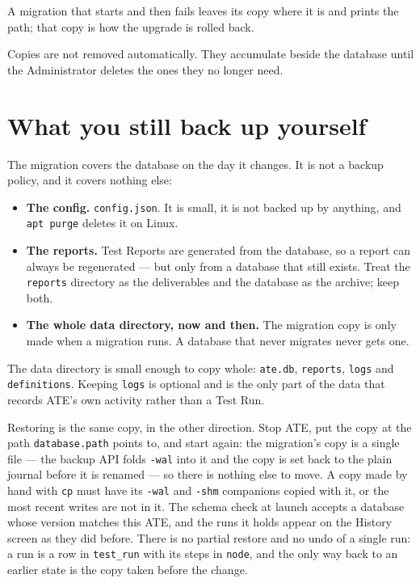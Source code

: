 A migration that starts and then fails leaves its copy where it is and prints the path; that copy is
how the upgrade is rolled back.

Copies are not removed automatically. They accumulate beside the database until the Administrator
deletes the ones they no longer need.

\section{What you still back up yourself}

The migration covers the database on the day it changes. It is not a backup policy, and it covers
nothing else:

\begin{itemize}
  \item \textbf{The config.} \texttt{config.json}. It is small, it is not backed up by anything, and
    \texttt{apt purge} deletes it on Linux.
  \item \textbf{The reports.} Test Reports are generated from the database, so a report can always be
    regenerated --- but only from a database that still exists. Treat the \texttt{reports} directory
    as the deliverables and the database as the archive; keep both.
  \item \textbf{The whole data directory, now and then.} The migration copy is only made when a
    migration runs. A database that never migrates never gets one.
\end{itemize}

The data directory is small enough to copy whole: \texttt{ate.db}, \texttt{reports}, \texttt{logs}
and \texttt{definitions}. Keeping \texttt{logs} is optional and is the only part of the data that
records ATE's own activity rather than a Test Run.

Restoring is the same copy, in the other direction. Stop ATE, put the copy at the path
\texttt{database.path} points to, and start again: the migration's copy is a single file --- the
backup API folds \texttt{-wal} into it and the copy is set back to the plain journal before it is
renamed --- so there is nothing else to move. A copy made by hand with \texttt{cp} must have its
\texttt{-wal} and \texttt{-shm} companions copied with it, or the most recent writes are not in it.
The schema check at launch accepts a database whose version matches this ATE, and the
runs it holds appear on the History screen as they did before. There is no partial restore and no
undo of a single run: a run is a row in \texttt{test\_run} with its steps in \texttt{node}, and the
only way back to an earlier state is the copy taken before the change.

